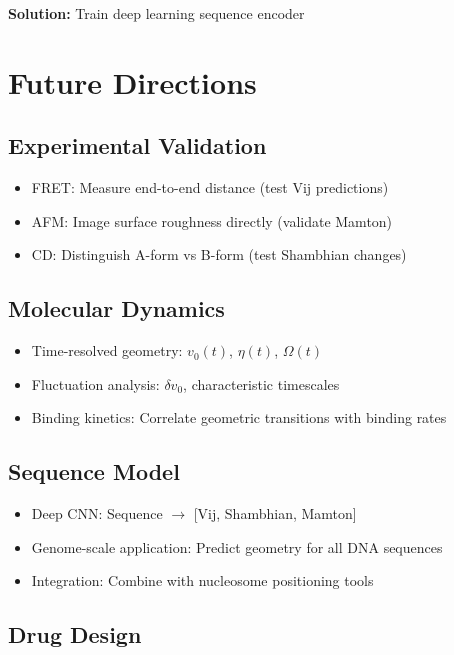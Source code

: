 \textbf{Solution:} Train deep learning sequence encoder

\section{Future Directions}

\subsection{Experimental Validation}

\begin{itemize}
    \item FRET: Measure end-to-end distance (test Vij predictions)
    \item AFM: Image surface roughness directly (validate Mamton)
    \item CD: Distinguish A-form vs B-form (test Shambhian changes)
\end{itemize}

\subsection{Molecular Dynamics}

\begin{itemize}
    \item Time-resolved geometry: $v_0(t)$, $\eta(t)$, $\Omega(t)$
    \item Fluctuation analysis: $\delta v_0$, characteristic timescales
    \item Binding kinetics: Correlate geometric transitions with binding rates
\end{itemize}

\subsection{Sequence Model}

\begin{itemize}
    \item Deep CNN: Sequence $\rightarrow$ [Vij, Shambhian, Mamton]
    \item Genome-scale application: Predict geometry for all DNA sequences
    \item Integration: Combine with nucleosome positioning tools
\end{itemize}

\subsection{Drug Design}

